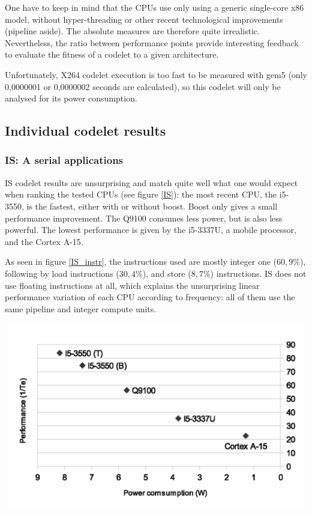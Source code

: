 \documentclass{article}
\newenvironment{Figure}
  {\par\medskip\noindent\center\minipage{0.9\linewidth}}
  {\endminipage\par\bigskip\medskip}
\begin{document}
\begin{multicols}{2}
One have to keep in mind that the CPUs use only using a generic single-core x86 model, without hyper-threading or other recent technological improvements (pipeline aside). The absolute measures are therefore quite irrealistic. Nevertheless, the ratio between performance points provide interesting feedback to evaluate the fitness of a codelet to a given architecture.

\newpage %
Unfortunately, X264 codelet execution is too fast to be measured with gem5 (only 0,0000001 or 0,0000002 seconds are calculated), so this codelet will only be analysed for its power consumption. 



\subsection{Individual codelet results}

\subsubsection{IS: A serial applications}
IS codelet results are unsurprising and match quite well what one would expect when ranking the tested CPUs (see figure \ref{IS}): the most recent CPU, the i5-3550, is the fastest, either with or without boost. Boost only gives a small performance improvement. The Q9100 consumes less power, but is also less powerful. The lowest performance is given by the i5-3337U, a mobile processor, and the Cortex A-15.

As seen in figure \ref{IS_instr}, the instructions used are mostly integer one ($60,9\%$), following by load instructions ($30,4\%$), and store ($8,7\%$) instructions. IS does not use floating instructions at all, which explains the unsurprising linear performance variation of each CPU according to frequency: all of them use the same pipeline and integer compute units.
\begin{Figure}
\centering
\includegraphics[width=\linewidth]{IS.eps}
\end{Figure}


\end{multicols}
\end{document}
